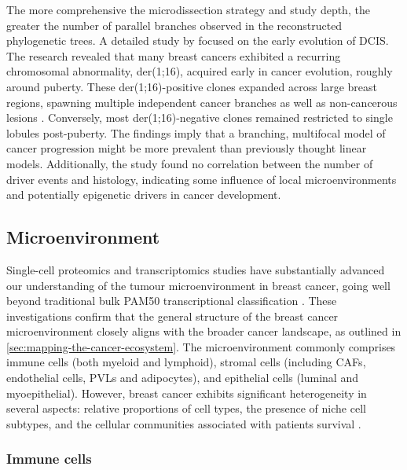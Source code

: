 The more comprehensive the microdissection strategy and study depth, the greater the number of parallel branches observed in the reconstructed phylogenetic trees. A detailed study by \parencite{Nishimura2023-mk} focused on the early evolution of \ac{DCIS}. The research revealed that many breast cancers exhibited a recurring chromosomal abnormality, der(1;16), acquired early in cancer evolution, roughly around puberty. These der(1;16)-positive clones expanded across large breast regions, spawning multiple independent cancer branches as well as non-cancerous lesions . Conversely, most der(1;16)-negative clones remained restricted to single lobules post-puberty. The findings imply that a branching, multifocal model of cancer progression might be more prevalent than previously thought linear models. Additionally, the study found no correlation between the number of driver events and histology, indicating some influence of local microenvironments and potentially epigenetic drivers in cancer development.

\subsection{Microenvironment}

Single-cell proteomics and transcriptomics studies have substantially advanced our understanding of the tumour microenvironment in breast cancer, going well beyond traditional bulk PAM50 transcriptional classification \parencite{Wu2021-uq,Pal2021-rf,Wagner2019-zp}. These investigations confirm that the general structure of the breast cancer microenvironment closely aligns with the broader cancer landscape, as outlined in \cref{sec:mapping-the-cancer-ecosystem}. The microenvironment commonly comprises immune cells (both myeloid and lymphoid), stromal cells (including \acfp{CAF}, endothelial cells, \acfp{PVL} and adipocytes), and epithelial cells (luminal and myoepithelial). However, breast cancer exhibits significant heterogeneity in several aspects: relative proportions of cell types, the presence of niche cell subtypes, and the cellular communities associated with patients survival \parencite{Jackson2020-em, Danenberg2022-zb}.

\subsubsection*{Immune cells}

